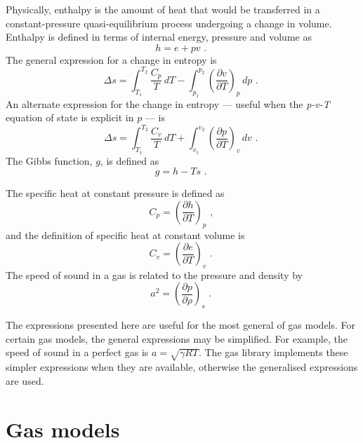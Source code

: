 Physically, enthalpy is the amount of heat that would be transferred
in a constant-pressure quasi-equilibrium process undergoing a change
in volume.
Enthalpy is defined in terms of internal energy, pressure and volume as
\begin{equation}
  h = e + pv \text{ . }
\end{equation}
The general expression for a change in entropy is
\begin{equation}
  \Delta s = \int_{T_1}^{T_2} \frac{C_p}{T}\,dT - \int_{p_1}^{p_2} \left ( \frac{\partial v}{\partial T} \right )_p\,dp \text{ . }
\end{equation}
An alternate expression for the change in entropy --- useful when the \textit{p-v-T}
equation of state is explicit in $p$ --- is
\begin{equation}
 \Delta s = \int_{T_1}^{T_2} \frac{C_v}{T}\,dT + \int_{v_1}^{v_2} \left( \frac{\partial p}{\partial T} \right)_v \, dv \text{ . }
\label{eq:s-p}
\end{equation}
The Gibbs function, $g$, is defined as
\begin{equation}
  g = h - Ts \text{ . }
\end{equation}

The specific heat at constant pressure is defined as
\begin{equation}
  C_p = \left ( \frac{\partial h}{\partial T} \right )_p \text{ , }
\end{equation}
and the definition of specific heat at constant volume is
\begin{equation}
  C_v = \left ( \frac{\partial e}{\partial T} \right )_v \text{ . }
\end{equation}
The speed of sound in a gas is related to the pressure and density
by
\begin{equation}
  a^2 = \left ( \frac{\partial p}{\partial \rho} \right )_s \text{ . }
\end{equation}

The expressions presented here are useful for the most general of gas models.
For certain gas models, the general expressions may be simplified.
For example, the speed of sound in a perfect gas is $a = \sqrt{\gamma R T}$.
The gas library implements these simpler expressions when they are available,
otherwise the generalised expressions are used.

\section{Gas models}
\label{sec:gmodels}

